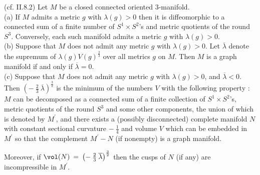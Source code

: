 \begin{proposition}
  \label{prop:kl-alternative-proof-cusp-incompressibility-characterization-graph-manifolds-2}
 (cf. II.8.2) \label{propII.8.2}
Let $M$ be a closed connected oriented $3$-manifold. \\
(a) If $M$ admits a metric $g$ with $\lambda(g) > 0$ then it is
diffeomorphic to a connected sum of a finite number of
$S^1 \times S^2$'s and metric quotients of the round $S^3$.
Conversely, each such manifold admits a metric $g$ with
$\lambda(g) > 0$. \\
(b) Suppose that $M$ does not admit any metric $g$ with
$\lambda(g) > 0$. Let $\overline{\lambda}$ denote the
supremum of $\lambda(g) V(g)^{\frac23}$ over all metrics $g$ on $M$.
Then $M$ is a graph manifold if and only if $\overline{\lambda}
= 0$. \\
(c) Suppose that $M$ does not admit any metric $g$ with
$\lambda(g) > 0$, and $\overline{\lambda} < 0$.
Then
$\left( - \: \frac23 \: \overline{\lambda}
\right)^{\frac32}$ is the minimum
of the numbers
$V$ with the following property : $M$ can be decomposed as a connected sum
of a finite collection of $S^1 \times S^2$'s, metric quotients of the round
$S^3$ and some other components, the union of which is denoted by
$M^\prime$, and there exists a (possibly disconnected) complete
manifold $N$ with constant sectional curvature $- \: \frac14$ and
volume $V$ which can be embedded in $M^\prime$ so that the
complement $M^\prime - N$ (if nonempty) is a graph manifold.

Moreover, if
$\vol(N) \: = \: \left( - \: \frac23 \: \overline{\lambda}
\right)^{\frac32}$
then the cusps of $N$ (if any) are incompressible in $M^\prime$.
\end{proposition}


